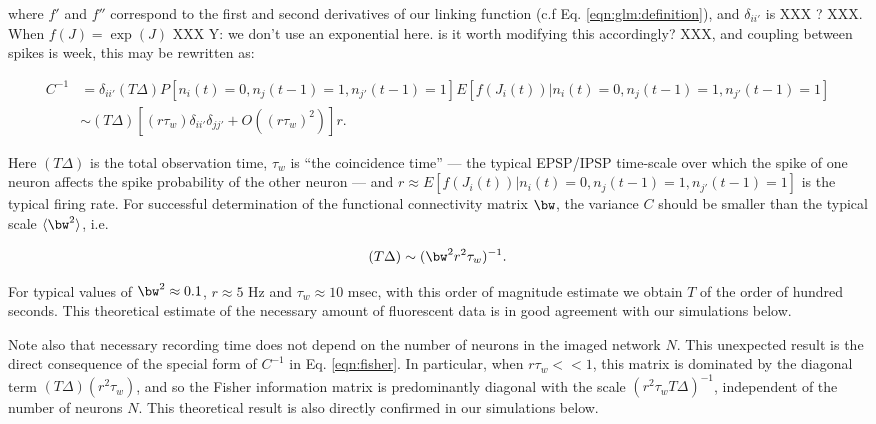 \noindent where $f'$ and $f''$ correspond to the first and second derivatives of our linking function (c.f Eq. \eqref{eqn:glm:definition}), and $\delta_{ii'}$ is XXX ? XXX.  When $f(J)=\exp(J)$ XXX Y: we don't use an exponential here.  is it worth modifying this accordingly? XXX, and coupling between spikes is week, this may be rewritten as:

\begin{equation}\label{eqn:fisher}
\begin{array}{rl}
C^{-1}
&=\delta_{ii'} (T\Delta) P[n_i(t)=0, n_j(t-1)=1, n_{j'}(t-1)=1]E[f(J_i(t))|n_i(t)=0, n_j(t-1)=1, n_{j'}(t-1)=1] \\
&\sim (T\Delta)\left[(r \tau_w)\delta_{ii'}\delta_{jj'}+O((r \tau_w)^2)\right]r.
\end{array}
\end{equation}

Here $(T\Delta)$ is the total observation time, $ \tau_w$ is ``the coincidence time'' --- the typical EPSP/IPSP time-scale over which the spike of one neuron affects the spike probability of the other neuron --- and $r \approx E[f(J_i(t))|n_i(t)=0, n_j(t-1)=1, n_{j'}(t-1)=1]$ is the typical firing rate.  For successful determination of the functional connectivity matrix $\bw$, the variance $C$ should be smaller than the typical scale $\langle \bw^2\rangle$, i.e.

\begin{equation}
(T\Delta) \sim (\bw^2 r^2  \tau_w)^{-1}.
\end{equation}

For typical values of $\bw^2\approx 0.1$, $r\approx 5$  Hz and $ \tau_w \approx 10$ msec, 
with this order of magnitude estimate we obtain $T$ of the order of hundred seconds. This theoretical estimate of the necessary amount of fluorescent data is in good agreement with our simulations below.

Note also that necessary recording time does not depend on the number of neurons in the imaged network $N$. This unexpected result is the direct consequence of the special form of $C^{-1}$ in Eq. \eqref{eqn:fisher}. In particular, when $r \tau_w <<1$, this matrix is dominated by the diagonal term $(T\Delta)(r^2  \tau_w)$, and so the Fisher information matrix is predominantly diagonal with the scale $(r^2 \tau_w T\Delta)^{-1}$, independent of the number of neurons $N$. This theoretical result is also directly confirmed in our simulations below.
